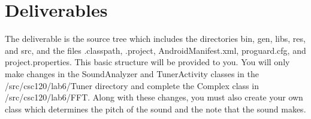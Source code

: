 \section{Deliverables}

The deliverable is the source tree which includes the directories bin, gen, libs, res, and src, and the files .classpath, .project, AndroidManifest.xml, proguard.cfg, and project.properties.  This basic structure will be provided to you.  
You will only make changes in the SoundAnalyzer and TunerActivity classes in the /src/csc120/lab6/Tuner directory and complete the Complex class in /src/csc120/lab6/FFT. 
Along with these changes, you must also create your own class which determines the pitch of the sound and the note that the sound makes.
